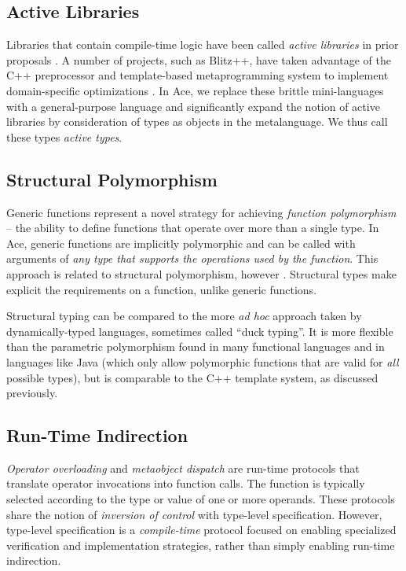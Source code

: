 \documentclass[9pt,preprint]{sigplanconf}
\begin{document}
\subsection{Active Libraries}
Libraries that contain compile-time logic have been called {\it active libraries} in prior proposals \cite{activelibraries}. A number of  projects, such as Blitz++, have taken advantage of the C++ preprocessor and template-based metaprogramming system to implement domain-specific optimizations \cite{veldhuizen2000blitz++}. In Ace, we replace these brittle mini-languages with a general-purpose language and significantly expand the notion of active libraries by consideration of types as objects in the metalanguage. We thus call these types \emph{active types}.


\subsection{Structural Polymorphism}
Generic functions represent a novel strategy for achieving {\it function polymorphism} -- the ability to define functions that operate over more than a single type. In Ace, generic functions are implicitly polymorphic and can be called with arguments of {\it any type that supports the operations used by the function}. This approach is related to structural polymorphism, however \cite{malayeri2009structural}. Structural types make explicit the requirements on a function, unlike generic functions.

Structural typing can be compared to the more \emph{ad hoc} approach taken by dynamically-typed languages, sometimes called ``duck typing''. It is more flexible than the parametric polymorphism found in many functional languages and in languages like Java (which only allow polymorphic functions that are valid for {\it all} possible types), but is comparable to the C++ template system, as discussed previously.

\subsection{Run-Time Indirection}
{\it Operator overloading} \cite{vanWijngaarden:Mailloux:Peck:Koster:Sintzoff:Lindsey:Meertens:Fisker:acta:1975} and {\it metaobject dispatch} \cite{Kiczales91} are run-time protocols that translate operator invocations into function calls. The function is typically selected according to the type or value of one or more operands. These protocols share the notion of {\it inversion of control} with type-level specification. However, type-level specification is a {\it compile-time} protocol focused on enabling specialized verification and implementation strategies, rather than simply enabling run-time indirection.
\end{document}
